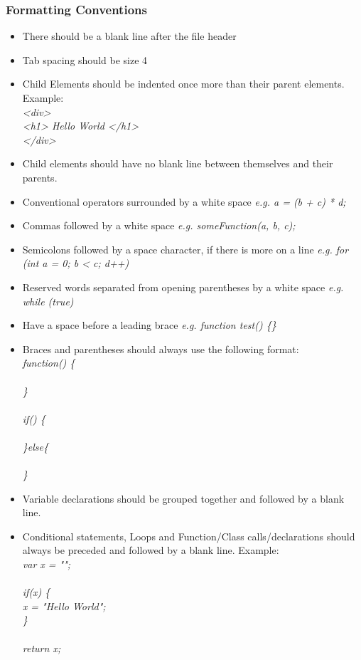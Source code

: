 \documentclass[12pt]{report}
\begin{document}
\subsubsection{Formatting Conventions}
	\begin{itemize}[noitemsep]
		\item There should be a blank line after the file header
        \item Tab spacing should be size 4
        \item Child Elements should be indented once more than their parent elements. Example:\\    
          \textit{<div>\\
                      \hspace*{4ex}<h1> Hello World </h1>\\
                  </div>}
        \item Child elements should have no blank line between themselves and their parents.
        \item Conventional operators surrounded by a white space \textit{e.g. a = (b + c) * d;}
        \item Commas followed by a white space \textit{e.g. someFunction(a, b, c);}
        \item Semicolons followed by a space character, if there is more on a line \textit{e.g. for (int a = 0; b < c; d++)}
        \item Reserved words separated from opening parentheses by a white space \textit{e.g. while (true) }
        \item Have a space before a leading brace \textit{e.g. function test() \{\} }
        \item Braces and parentheses should always use the following format:\\
          \textit{
            function() \{ \\
            \\
            \}  \\
            \\
            if() \{ \\
            \\
            \}else\{ \\
            \\
            \} 
          }
        \item Variable declarations should be grouped together and followed by a blank line.
        \item Conditional statements, Loops and Function/Class calls/declarations should always be preceded and followed by a blank line. Example: 
        \\
        \textit{ var x = ""; \\
        \\
          if(x) \{ \\
          \hspace*{4ex}x = "Hello World";\\
          \} \\
          \\
          return x; 
        }
    \end{itemize}
    
\end{document}
